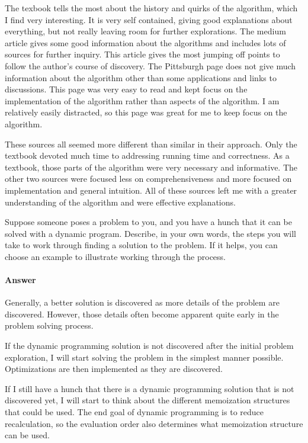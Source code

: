 \documentclass{article}
\begin{document}
The texbook tells the most about the history and quirks of the algorithm, which I find very interesting. It is very self contained, giving good explanations about everything, but not really leaving room for further explorations. The medium article gives some good information about the algorithms and includes lots of sources for further inquiry. This article gives the most jumping off points to follow the author's course of discovery. The Pittsburgh page does not give much information about the algorithm other than some applications and links to discussions. This page was very easy to read and kept focus on the implementation of the algorithm rather than aspects of the algorithm. I am relatively easily distracted, so this page was great for me to keep focus on the algorithm.

These sources all seemed more different than similar in their approach. Only the textbook devoted much time to addressing running time and correctness. As a textbook, those parts of the algorithm were very necessary and informative. The other two sources were focused less on comprehensiveness and more focused on implementation and general intuition. All of these sources left me with a greater understanding of the algorithm and were effective explanations.


Suppose someone poses a problem to you, and you have a hunch that it can be
solved with a dynamic program.  Describe, in your own words, the steps you will
take to work through finding a solution to the problem.  If it helps, you can
choose an example to illustrate working through the process.

\paragraph{Answer}

Generally, a better solution is discovered as more details of the problem are discovered. However, those details often become apparent quite early in the problem solving process.

If the dynamic programming solution is not discovered after the initial problem exploration, I will start solving the problem in the simplest manner possible. Optimizations are then implemented as they are discovered.

If I still have a hunch that there is a dynamic programming solution that is not discovered yet, I will start to think about the different memoization structures that could be used. The end goal of dynamic programming is to reduce recalculation, so the evaluation order also determines what memoization structure can be used.
\end{document}
